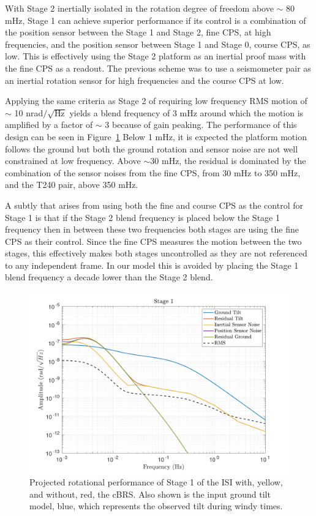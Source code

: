 \documentclass [12pt, proquest]{uwthesis}[2019]
\begin{document}
With Stage 2 inertially isolated in the rotation degree of freedom above $\sim$ 80 mHz, Stage 1 can achieve superior performance if its control is a combination of the position sensor between the Stage 1 and Stage 2, fine CPS, at high frequencies, and the position sensor between Stage 1 and Stage 0, course CPS, as low. This is effectively using the Stage 2 platform as an inertial proof mass with the fine CPS as a readout. The previous scheme was to use a seismometer pair as an inertial rotation sensor for high frequencies and the course CPS at low. 

Applying the same criteria as Stage 2 of requiring low frequency RMS motion of $\sim$ 10 nrad$/\sqrt{\text{Hz}}$ yields a blend frequency of 3 mHz around which the motion is amplified by a factor of $\sim$ 3 because of gain peaking. The performance of this design can be seen in Figure~\ref{cBRS1R} Below 1 mHz, it is expected the platform motion follows the ground but both the ground rotation and sensor noise are not well constrained at low frequency. Above $\sim$30 mHz, the residual is dominated by the combination of the sensor noises from the fine CPS, from 30 mHz to 350 mHz, and the T240 pair, above 350 mHz.

A subtly that arises from using both the fine and course CPS as the control for Stage 1 is that if the Stage 2 blend frequency is placed below the Stage 1 frequency then in between these two frequencies both stages are using the fine CPS as their control. Since the fine CPS measures the motion between the two stages, this effectively makes both stages uncontrolled as they are not referenced to any independent frame. In our model this is avoided by placing the Stage 1 blend frequency a decade lower than the Stage 2 blend.

\begin{figure}[!h]
\begin{center}
\includegraphics[width=\textwidth]{cBRS_Model_ST1RX.pdf}
\caption{Projected rotational performance of Stage 1 of the ISI with, yellow, and without, red, the cBRS. Also shown is the input ground tilt model, blue, which represents the observed tilt during windy times.}
\label{cBRS1R}
\end{center}
\end{figure}
\end{document}
